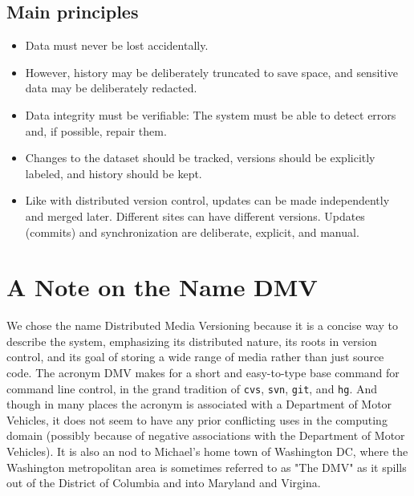 \subsection{Main principles}

\begin{itemize}

  \item Data must never be lost accidentally.

  \item However, history may be deliberately truncated to save space, and
    sensitive data may be deliberately redacted.

  \item Data integrity must be verifiable: The system must be able to detect
    errors and, if possible, repair them.

  \item Changes to the dataset should be tracked, versions should be explicitly
    labeled, and history should be kept.

  \item Like with distributed version control, updates can be made independently
    and merged later. Different sites can have different versions. Updates
    (commits) and synchronization are deliberate, explicit, and manual.

\end{itemize}

\section{A Note on the Name DMV}

We chose the name Distributed Media Versioning because it is a concise way to
describe the system, emphasizing its distributed nature, its roots in version
control, and its goal of storing a wide range of media rather than just source
code. The acronym DMV makes for a short and easy-to-type base command for
command line control, in the grand tradition of \lstinline{cvs},
\lstinline{svn}, \lstinline{git}, and \lstinline{hg}. And though in many places
the acronym is associated with a Department of Motor Vehicles, it does not seem
to have any prior conflicting uses in the computing domain (possibly because of
negative associations with the Department of Motor Vehicles). It is also an nod
to Michael's home town of Washington DC, where the Washington metropolitan area
is sometimes referred to as "The DMV" as it spills out of the District of
Columbia and into Maryland and Virgina.
